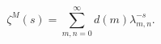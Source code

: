 \begin{equation}
\label{gfunc}
\zeta^M(s)=\sum_{m,n=0}^\infty d(m) \lambda_{m,n}^{-s}.
\end{equation}

